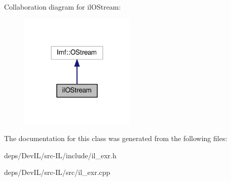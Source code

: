 Collaboration diagram for il\+O\+Stream\+:
\nopagebreak
\begin{figure}[H]
\begin{center}
\leavevmode
\includegraphics[width=156pt]{df/d43/classilOStream__coll__graph}
\end{center}
\end{figure}


The documentation for this class was generated from the following files\+:\begin{DoxyCompactItemize}
\item 
deps/\+Dev\+I\+L/src-\/\+I\+L/include/il\+\_\+exr.\+h\item 
deps/\+Dev\+I\+L/src-\/\+I\+L/src/il\+\_\+exr.\+cpp\end{DoxyCompactItemize}
